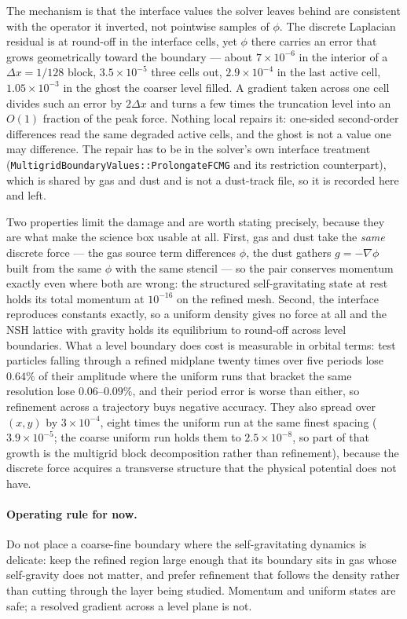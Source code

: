 \documentclass[11pt]{article}
\newcommand{\fn}[1]{\texttt{\small #1}}
\begin{document}
The mechanism is that the interface values the solver leaves behind are consistent with
the operator it inverted, not pointwise samples of $\phi$. The discrete Laplacian
residual is at round-off in the interface cells, yet $\phi$ there carries an error that
grows geometrically toward the boundary --- about $7\times10^{-6}$ in the interior of a
$\Delta x = 1/128$ block, $3.5\times10^{-5}$ three cells out, $2.9\times10^{-4}$ in the
last active cell, $1.05\times10^{-3}$ in the ghost the coarser level filled. A gradient
taken across one cell divides such an error by $2\Delta x$ and turns a few times the
truncation level into an $O(1)$ fraction of the peak force. Nothing local repairs it:
one-sided second-order differences read the same degraded active cells, and the ghost is
not a value one may difference. The repair has to be in the solver's own interface
treatment (\fn{MultigridBoundaryValues::ProlongateFCMG} and its restriction counterpart),
which is shared by gas and dust and is not a dust-track file, so it is recorded here and
left.

Two properties limit the damage and are worth stating precisely, because they are what
make the science box usable at all. First, gas and dust take the \emph{same} discrete
force --- the gas source term differences $\phi$, the dust gathers $g = -\nabla\phi$ built
from the same $\phi$ with the same stencil --- so the pair conserves momentum exactly
even where both are wrong: the structured self-gravitating state at rest holds its total
momentum at $10^{-16}$ on the refined mesh. Second, the interface reproduces constants
exactly, so a uniform density gives no force at all and the NSH lattice with gravity holds
its equilibrium to round-off across level boundaries. What a level boundary does cost is
measurable in orbital terms: test particles falling through a refined midplane twenty
times over five periods lose $0.64\%$ of their amplitude where the uniform runs that
bracket the same resolution lose $0.06$--$0.09\%$, and their period error is worse than
either, so refinement across a trajectory buys negative accuracy. They also spread over
$(x,y)$ by $3\times10^{-4}$, eight times the uniform run at the same finest spacing
($3.9\times10^{-5}$; the coarse uniform run holds them to $2.5\times10^{-8}$, so part of
that growth is the multigrid block decomposition rather than refinement), because the
discrete force acquires a transverse structure that the physical potential does not have.

\paragraph{Operating rule for now.} Do not place a coarse-fine boundary where the
self-gravitating dynamics is delicate: keep the refined region large enough that its
boundary sits in gas whose self-gravity does not matter, and prefer refinement that
follows the density rather than cutting through the layer being studied. Momentum and
uniform states are safe; a resolved gradient across a level plane is not.
\end{document}
